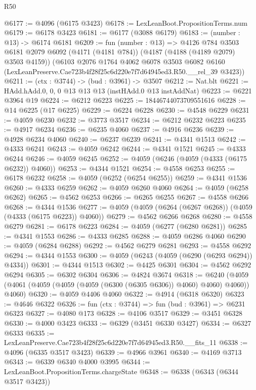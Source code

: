 \begin{lexlean}{R50}
\begin{coremodule}
@6177 := @4096 (@6175 @3423)
@6178 := LexLeanBoot.PropositionTerms.num
@6179 := @6178 @3423
@6181 := @6177 (@3088 @6179)
@6183 := (number : @13) -> @6174 @6181
@6209 := fun (number : @13) =>
  @4126
    @784
    @3503
    @6181
    @2079
    @6092
    (@4171 (@4181 @784))
    (@4187 (@4188 (@4189 @2079) @3503 @4159))
    (@6103
      @2076
      @1764
      @4062
      @6078
      @3503
      @6082
      @6160
      (LexLeanPreserve.Cae723b4f28f25c6d220e7f7d64945ed3.R50.__rel_39 @3423))
@6211 := (ctx : @3744) -> (bud : @3961) -> @3507
@6212 := Nat.blt
@6221 := HAdd.hAdd.{0, 0, 0} @13 @13 @13 (instHAdd.{0} @13 instAddNat)
@6223 := @6221 @3964 @19
@6224 := @6212 @6223
@6225 := 18446744073709551616
@6228 := @14 @6225 (@17 @6225)
@6229 := @6224 @6228
@6230 := @4548 @6229
@6231 := @4059 @6230
@6232 := @3773 @3517
@6234 := @6212 @6232 @6223
@6235 := @4917 @6234
@6236 := @6235 @4060
@6237 := @4916 @6236
@6239 := @4928 @6234 @4060
@6240 := @6237 @6239
@6241 := @4341 @1513
@6242 := @4333 @6241
@6243 := @4059 @6242
@6244 := @4341 @1521
@6245 := @4333 @6244
@6246 := @4059 @6245
@6252 := @4059 (@6246 (@4059 (@4333 (@6175 @6232)) @4060))
@6253 := @4344 @1521
@6254 := @4558 @6253
@6255 := @6178 @6232
@6258 := @4059 (@6252 (@6254 @6255))
@6259 := @4341 @1536
@6260 := @4333 @6259
@6262 := @4059 @6260 @4060
@6264 := @4059 (@6258 @6262)
@6265 := @4562 @6253
@6266 := @6265 @6255
@6267 := @4558 @6266
@6268 := @4344 @1536
@6277 := @4059 (@4059 (@6264 (@6267 @6268)) (@4059 (@4333 (@6175 @6223)) @4060))
@6279 := @4562 @6266 @6268
@6280 := @4558 @6279
@6281 := @6178 @6223
@6284 := @4059 (@6277 (@6280 @6281))
@6285 := @4341 @1553
@6286 := @4333 @6285
@6288 := @4059 @6286 @4060
@6290 := @4059 (@6284 @6288)
@6292 := @4562 @6279 @6281
@6293 := @4558 @6292
@6294 := @4344 @1553
@6300 := @4059 (@6243 (@4059 (@6290 (@6293 @6294)) @4334))
@6301 := @4344 @1513
@6302 := @4425 @6301
@6304 := @4562 @6292 @6294
@6305 := @6302 @6304
@6306 := @4824 @3674
@6318 := @6240 (@4059 (@4061 (@4059 (@4059 (@4059 (@6300 (@6305 @6306)) @4060) @4060) @4060)) @4060)
@6320 := @4059 @4406 @4060
@6322 := @4914 (@6318 @6320)
@6323 := @4646 @6322
@6326 := fun (ctx : @3744) => fun (bud : @3961) => @6231 @6323
@6327 := @4080 @173
@6328 := @4106 @3517
@6329 := @3451 @6328
@6330 := @4000 @3423
@6333 := @6329 (@3451 @6330 @3427)
@6334 := @6327 @6333
@6335 := LexLeanPreserve.Cae723b4f28f25c6d220e7f7d64945ed3.R50.__fits_11
@6338 := @4096 (@6335 @3517 @3423)
@6339 := @4966 @3961
@6340 := @4169 @3713
@6343 := @6339 @6340 @4000 @3995
@6344 := LexLeanBoot.PropositionTerms.chargeState
@6348 := @6338 (@6343 (@6344 @3517 @3423))

\end{coremodule}
\end{lexlean}
